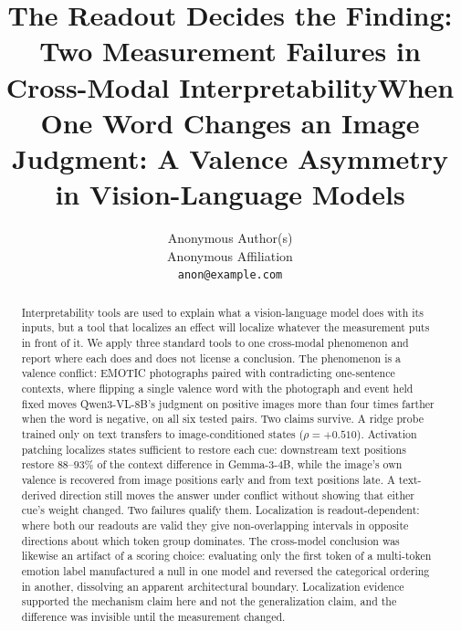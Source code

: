 \documentclass{article}
\title{The Readout Decides the Finding: Two Measurement Failures in Cross-Modal Interpretability}
\title{When One Word Changes an Image Judgment: A Valence Asymmetry in Vision-Language Models}
\author{%
  Anonymous Author(s) \\
  Anonymous Affiliation \\
  \texttt{anon@example.com} \\
}
\newif\ifshort
\newcommand{\gemma}{Gemma-3-4B}
\newcommand{\qwen}{Qwen3-VL-8B}
\begin{document}
\maketitle

\ifshort
\begin{abstract}
Interpretability tools are used to explain what a vision-language model does with its inputs, but a tool that localizes an effect will localize whatever the measurement puts in front of it. We apply three standard tools to one cross-modal phenomenon and report where each does and does not license a conclusion. The phenomenon is a valence conflict: EMOTIC photographs paired with contradicting one-sentence contexts, where flipping a single valence word with the photograph and event held fixed moves \qwen{}'s judgment on positive images more than four times farther when the word is negative, on all six tested pairs. Two claims survive. A ridge probe trained only on text transfers to image-conditioned states ($\rho=+0.510$). Activation patching localizes states sufficient to restore each cue: downstream text positions restore $88$--$93\%$ of the context difference in \gemma{}, while the image's own valence is recovered from image positions early and from text positions late. A text-derived direction still moves the answer under conflict without showing that either cue's weight changed. Two failures qualify them. Localization is readout-dependent: where both our readouts are valid they give non-overlapping intervals in opposite directions about which token group dominates. The cross-model conclusion was likewise an artifact of a scoring choice: evaluating only the first token of a multi-token emotion label manufactured a null in one model and reversed the categorical ordering in another, dissolving an apparent architectural boundary. Localization evidence supported the mechanism claim here and not the generalization claim, and the difference was invisible until the measurement changed.
\end{abstract}
\else
\end{document}
